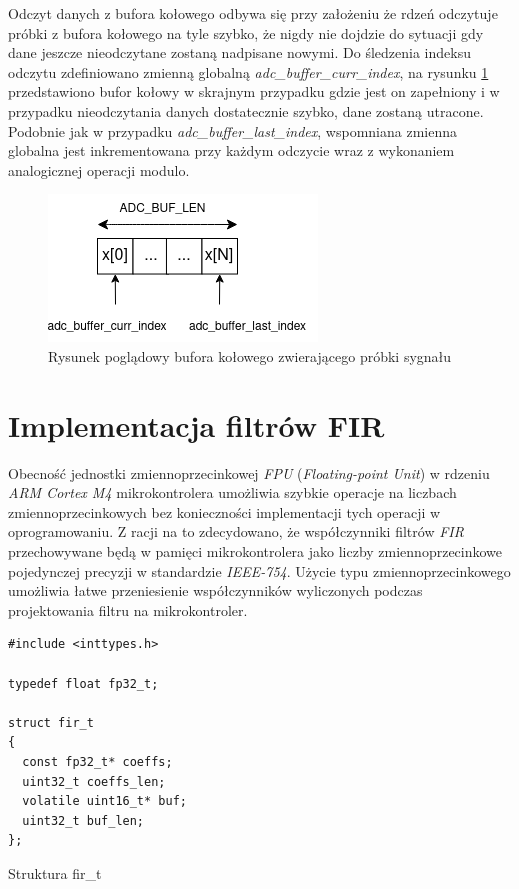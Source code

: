 Odczyt danych z bufora kołowego odbywa się przy założeniu że rdzeń odczytuje próbki z bufora kołowego na tyle szybko,
że nigdy nie dojdzie do sytuacji gdy dane jeszcze nieodczytane zostaną nadpisane nowymi. Do śledzenia indeksu odczytu
zdefiniowano zmienną globalną \textit{adc\_buffer\_curr\_index}, na rysunku \ref{fig:rbuffer} przedstawiono bufor
kołowy w skrajnym przypadku gdzie jest on zapełniony i w przypadku nieodczytania danych dostatecznie szybko, dane zostaną utracone.
Podobnie jak w przypadku \textit{adc\_buffer\_last\_index}, wspomniana zmienna globalna jest inkrementowana przy każdym odczycie
wraz z wykonaniem analogicznej operacji modulo.

\begin{figure}[h!]
    \centering 
    \includegraphics[scale=0.7]{pl/media/rbuffer.png}
    \caption{Rysunek poglądowy bufora kołowego zwierającego próbki sygnału}
    \label{fig:rbuffer}
\end{figure}

\newpage
\section{Implementacja filtrów FIR}

Obecność jednostki zmiennoprzecinkowej \textit{FPU} (\textit{Floating-point Unit}) w rdzeniu \textit{ARM Cortex M4} 
mikrokontrolera umożliwia szybkie operacje na liczbach zmiennoprzecinkowych bez konieczności implementacji tych operacji 
w oprogramowaniu. Z racji na to zdecydowano, że współczynniki filtrów \textit{FIR} przechowywane będą w pamięci 
mikrokontrolera jako liczby zmiennoprzecinkowe pojedynczej precyzji w standardzie \textit{IEEE-754}. Użycie typu
zmiennoprzecinkowego umożliwia łatwe przeniesienie współczynników wyliczonych podczas projektowania filtru na mikrokontroler.

\begin{listing}
\begin{verbatim}
#include <inttypes.h>

typedef float fp32_t;

struct fir_t
{
  const fp32_t* coeffs;
  uint32_t coeffs_len;
  volatile uint16_t* buf;
  uint32_t buf_len; 
};
\end{verbatim} 
\caption{Struktura fir\_t}
\label{listing:firt}
\end{listing}

